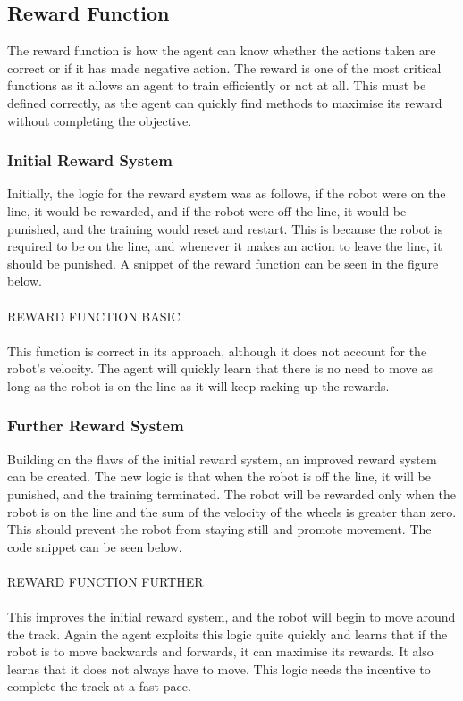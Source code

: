 \documentclass[a4paper,11pt]{article}
\begin{document}
\subsection{Reward Function}

The reward function is how the agent can know whether the actions taken are correct or if it has made negative action. The reward is one of the most critical functions as it allows an agent to train efficiently or not at all. This must be defined correctly, as the agent can quickly find methods to maximise its reward without completing the objective.

\subsubsection{Initial Reward System}

Initially, the logic for the reward system was as follows, if the robot were on the line, it would be rewarded, and if the robot were off the line, it would be punished, and the training would reset and restart. This is because the robot is required to be on the line, and whenever it makes an action to leave the line, it should be punished. A snippet of the reward function can be seen in the figure below.
\\\\
REWARD FUNCTION BASIC
\\\\
This function is correct in its approach, although it does not account for the robot's velocity. The agent will quickly learn that there is no need to move as long as the robot is on the line as it will keep racking up the rewards.
 

\subsubsection{Further Reward System}

Building on the flaws of the initial reward system, an improved reward system can be created. The new logic is that when the robot is off the line, it will be punished, and the training terminated. The robot will be rewarded only when the robot is on the line and the sum of the velocity of the wheels is greater than zero. This should prevent the robot from staying still and promote movement. The code snippet can be seen below.
\\\\
REWARD FUNCTION FURTHER
\\\\
This improves the initial reward system, and the robot will begin to move around the track. Again the agent exploits this logic quite quickly and learns that if the robot is to move backwards and forwards, it can maximise its rewards. It also learns that it does not always have to move. This logic needs the incentive to complete the track at a fast pace.
\end{document}

